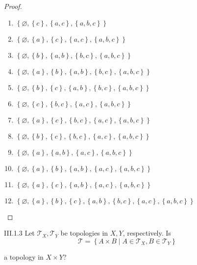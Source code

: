 \begin{proof}
\begin{enumerate}
		\item \( \left\{ \varnothing, \left\{ c \right\}, \left\{ a, c \right\}, \left\{ a, b, c \right\} \right\} \)
		\item \( \left\{ \varnothing, \left\{ a \right\}, \left\{ c \right\}, \left\{ a, c \right\}, \left\{ a, b, c \right\} \right\} \)
		\item \( \left\{ \varnothing, \left\{ b \right\}, \left\{ a, b \right\}, \left\{ b, c \right\}, \left\{ a, b, c \right\} \right\} \)
		\item \( \left\{ \varnothing, \left\{ a \right\}, \left\{ b \right\}, \left\{ a, b \right\}, \left\{ b, c \right\}, \left\{ a, b, c \right\} \right\} \)
		\item \( \left\{ \varnothing, \left\{ b \right\}, \left\{ c \right\}, \left\{ a, b \right\}, \left\{ b, c \right\}, \left\{ a, b, c \right\} \right\} \)
		\item \( \left\{ \varnothing, \left\{ c \right\}, \left\{ b, c \right\}, \left\{ a, c \right\}, \left\{ a, b, c \right\} \right\} \)
		\item \( \left\{ \varnothing, \left\{ a \right\}, \left\{ c \right\}, \left\{ b, c \right\}, \left\{ a, c \right\}, \left\{ a, b, c \right\} \right\} \)
		\item \( \left\{ \varnothing, \left\{ b \right\}, \left\{ c \right\}, \left\{ b, c \right\}, \left\{ a, c \right\}, \left\{ a, b, c \right\} \right\} \)
		\item \( \left\{ \varnothing, \left\{ a \right\}, \left\{ a, b \right\}, \left\{ a, c \right\}, \left\{ a, b, c \right\} \right\} \)
		\item \( \left\{ \varnothing, \left\{ a \right\}, \left\{ b \right\}, \left\{ a, b \right\}, \left\{ a, c \right\}, \left\{ a, b, c \right\} \right\} \)
		\item \( \left\{ \varnothing, \left\{ a \right\}, \left\{ c \right\}, \left\{ a, b \right\}, \left\{ a, c \right\}, \left\{ a, b, c \right\} \right\} \)
		\item \( \left\{ \varnothing, \left\{ a \right\}, \left\{ b \right\}, \left\{ c \right\}, \left\{ a, b \right\}, \left\{ b, c \right\}, \left\{ a, c \right\}, \left\{ a, b, c \right\} \right\} \)
	\end{enumerate}
\end{proof}

\begin{problem}{III.1.3}
Let \( \mathscr{T}_{X}, \mathscr{T}_{Y} \) be topologies in \( X, Y \), respectively. Is
\[ \mathscr{T} = \left\{ A\times B \mid A \in \mathscr{T}_{X}, B \in \mathscr{T}_{Y} \right\} \]

a topology in \( X\times Y \)?
\end{problem}

